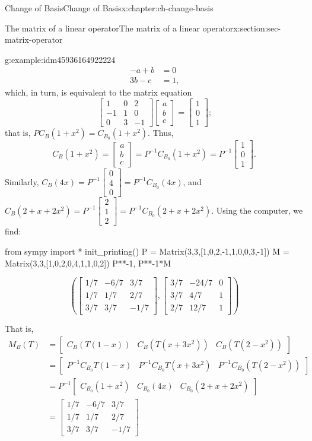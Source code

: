 \documentclass[oneside,10pt,]{book}
\numberwithin{equation}{section}
\newcommand{\bbm}{\begin{bmatrix}}
\newcommand{\ebm}{\end{bmatrix}}
\newcommand{\amp}{&}
\begin{document}
\begin{chapterptx}{Change of Basis}{}{Change of Basis}{}{}{x:chapter:ch-change-basis}
\begin{sectionptx}{The matrix of a linear operator}{}{The matrix of a linear operator}{}{}{x:section:sec-matrix-operator}
\begin{example}{}{g:example:idm45936164922224}
\begin{align*}
-a+b \amp =0\\
3b-c \amp =1\text{,}
\end{align*}
which, in turn, is equivalent to the matrix equation%
\begin{equation*}
\bbm 1\amp 0\amp 2\\-1\amp 1\amp 0\\0\amp 3\amp -1\ebm\bbm a\\b\\c\ebm = \bbm 1\\0\\1\ebm\text{;}
\end{equation*}
that is, \(PC_B(1+x^2) = C_{B_0}(1+x^2)\). Thus,%
\begin{equation*}
C_B(1+x^2) = \bbm a\\b\\c\ebm = P^{-1}C_{B_0}(1+x^2) = P^{-1}\bbm 1\\0\\1\ebm\text{.}
\end{equation*}
Similarly, \(C_B(4x)=P^{-1}\bbm 0\\4\\0\ebm = P^{-1}C_{B_0}(4x)\), and \(C_B(2+x+2x^2)=P^{-1}\bbm 2\\1\\2\ebm = P^{-1}C_{B_0}(2+x+2x^2)\). Using the computer, we find:%
\begin{sageinput}
from sympy import *
init_printing()
P = Matrix(3,3,[1,0,2,-1,1,0,0,3,-1])
M = Matrix(3,3,[1,0,2,0,4,1,1,0,2])
P**-1, P**-1*M
\end{sageinput}
\begin{sageoutput}
\[\left(\bbm 1/7\amp -6/7\amp 3/7\\1/7\amp 1/7\amp 2/7\\3/7\amp 3/7\amp -1/7\ebm, \bbm 3/7\amp -24/7\amp 0\\3/7\amp 4/7\amp 1\\2/7\amp 12/7\amp 1\ebm\right)\]
\end{sageoutput}
That is,%
\begin{align*}
M_B(T) \amp =\bbm C_B(T(1-x)) \amp C_B(T(x+3x^2)) \amp C_B(T(2-x^2))\ebm\\
\amp =\bbm P^{-1}C_{B_0}T(1-x) \amp P^{-1} C_{B_0}T(x+3x^2) \amp P^{-1}C_{B_0}(T(2-x^2))\ebm\\
\amp =P^{-1}\bbm C_{B_0}(1+x^2) \amp C_{B_0}(4x)\amp C_{B_0}(2+x+2x^2)\ebm\\
\amp =\bbm 1/7\amp -6/7\amp 3/7\\1/7\amp 1/7\amp 2/7\\3/7\amp 3/7\amp -1/7\ebm

\end{align*}
\end{example}
\end{sectionptx}
\end{chapterptx}
\end{document}
